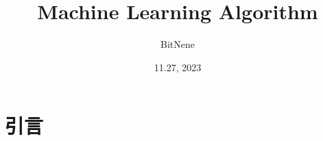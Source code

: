 \documentclass{article}
\title{Machine Learning Algorithm}
\author{BitNene}
\date{11.27, 2023}
\begin{document}
\maketitle %

\begin{abstract}
\end{abstract}

\tableofcontents %

\section{引言}








\end{document}
